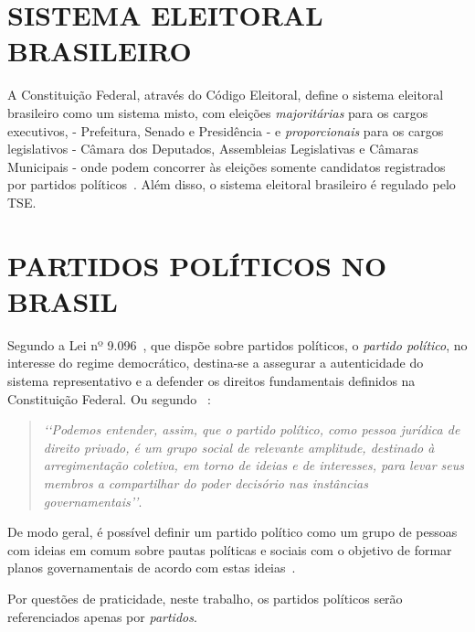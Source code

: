 
\section{\texorpdfstring{\MakeUppercase{Sistema Eleitoral Brasileiro}}{}}

A Constituição Federal, através do Código Eleitoral, define o sistema eleitoral brasileiro como um sistema misto, com eleições \emph{majoritárias} para os cargos executivos, - Prefeitura, Senado e Presidência - e \emph{proporcionais} para os cargos legislativos - Câmara dos Deputados, Assembleias Legislativas e Câmaras Municipais - onde podem concorrer às eleições somente candidatos registrados por partidos políticos~\cite{brasil1965lei4737}. Além disso, o sistema eleitoral brasileiro é regulado pelo \gls{TSE}.

\section{\texorpdfstring{\MakeUppercase{Partidos Políticos no Brasil}}{}}
\label{conceitos__partidos-brasil}
    
Segundo a  Lei nº 9.096~\cite{brasil1995lei9096}, que dispõe sobre partidos políticos, o \emph{partido político}, no interesse do regime democrático, destina-se a assegurar a autenticidade do sistema representativo e a defender os direitos fundamentais definidos na Constituição Federal. Ou segundo ~\cite{michels2006direito}:

\begin{quotation}
    \emph{‘‘Podemos entender, assim, que o partido político, como pessoa jurídica de direito privado, é um grupo social de relevante amplitude, destinado à arregimentação coletiva, em torno de ideias e de interesses, para levar seus membros a compartilhar do poder decisório nas instâncias governamentais’’}.
\end{quotation}

De modo geral, é possível definir um partido político como um grupo de pessoas com ideias em comum sobre pautas políticas e sociais com o objetivo de formar planos governamentais de acordo com estas ideias~\cite{garibaldi2017partidos}.

Por questões de praticidade, neste trabalho, os partidos políticos serão referenciados apenas por \emph{partidos}. 

